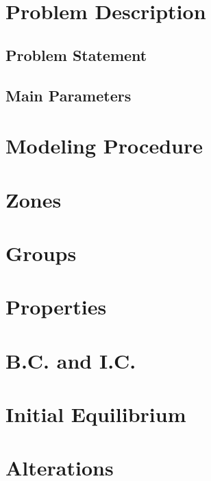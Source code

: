 \documentclass[a4paper, nobind]{templates/ociamthesis}
\begin{document}
\hypertarget{problem-description}{%
\section{Problem Description}\label{problem-description}}

\hypertarget{problem-statement}{%
\subsection{Problem Statement}\label{problem-statement}}

\hypertarget{main-parameters}{%
\subsection{Main Parameters}\label{main-parameters}}

\hypertarget{modeling-procedure}{%
\section{Modeling Procedure}\label{modeling-procedure}}

\hypertarget{zones}{%
\section{Zones}\label{zones}}

\hypertarget{groups}{%
\section{Groups}\label{groups}}

\hypertarget{properties}{%
\section{Properties}\label{properties}}

\hypertarget{b.c.-and-i.c.}{%
\section{B.C. and I.C.}\label{b.c.-and-i.c.}}

\hypertarget{initial-equilibrium}{%
\section{Initial Equilibrium}\label{initial-equilibrium}}

\hypertarget{alterations}{%
\section{Alterations}\label{alterations}}
\end{document}
